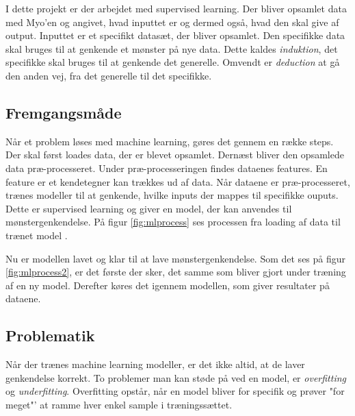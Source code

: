 I dette projekt er der arbejdet med supervised learning. Der bliver opsamlet data med Myo'en og angivet, hvad inputtet er og dermed også, hvad den skal give af output. Inputtet er et specifikt datasæt, der bliver opsamlet. Den specifikke data skal bruges til at genkende et mønster på nye data. Dette kaldes \textit{induktion}, det specifikke skal bruges til at genkende det generelle. Omvendt er \textit{deduction} at gå den anden vej, fra det generelle til det specifikke.

\subsection{Fremgangsmåde}
Når et problem løses med machine learning, gøres det gennem en række steps. Der skal først loades data, der er blevet opsamlet. Dernæst bliver den opsamlede data præ-processeret. Under præ-processeringen findes dataenes features. En feature er et kendetegner kan trækkes ud af data. Når dataene er præ-processeret, trænes modeller til at genkende, hvilke inputs der mappes til specifikke ouputs. Dette er supervised learning og giver en model, der kan anvendes til mønstergenkendelse. På figur \ref{fig:mlprocess} ses processen fra loading af data til trænet model \citep{MLMadeEasy}.


Nu er modellen lavet og klar til at lave mønstergenkendelse. Som det ses på figur \ref{fig:mlprocess2}, er det første der sker, det samme som bliver gjort under træning af en ny model. Derefter køres det igennem modellen, som giver resultater på dataene.


\subsection{Problematik}
Når der trænes machine learning modeller, er det ikke altid, at de laver genkendelse korrekt. To problemer man kan støde på ved en model, er \textit{overfitting} og \textit{underfitting}. Overfitting opstår, når en model bliver for specifik og prøver "for meget"' at ramme hver enkel sample i træningssættet.

